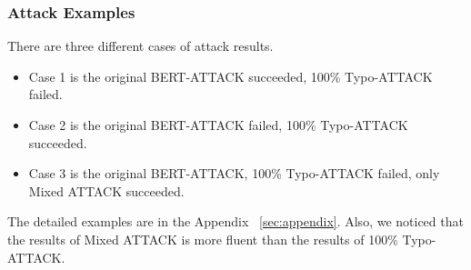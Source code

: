\documentclass[11pt,a4paper]{article}
\begin{document}
\subsubsection{Attack Examples}
There are three different cases of attack results.
\begin{itemize}
\item Case 1 is the original BERT-ATTACK succeeded, 100\% Typo-ATTACK failed.
\item Case 2 is the original BERT-ATTACK failed, 100\% Typo-ATTACK succeeded.
\item Case 3 is the original BERT-ATTACK, 100\% Typo-ATTACK failed, only Mixed ATTACK succeeded.
\end{itemize}

The detailed examples are in the Appendix ~\ref{sec:appendix}.
Also, we noticed that the results of Mixed ATTACK is more fluent than the results of 100\% Typo-ATTACK.
\end{document}
